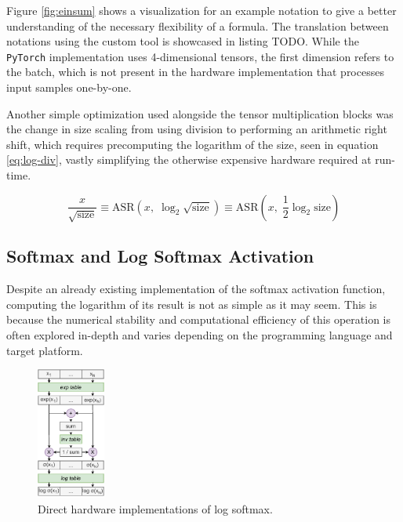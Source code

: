 Figure \ref{fig:einsum} shows a visualization for an example notation to give a better understanding of the necessary flexibility of a formula. The translation between notations using the custom tool is showcased in listing TODO. While the \texttt{PyTorch} implementation uses 4-dimensional tensors, the first dimension refers to the batch, which is not present in the hardware implementation that processes input samples one-by-one.

\todofig{|}
\todofig{|}
\todofig{|}
\todofig{|}
\todofig{|}

Another simple optimization used alongside the tensor multiplication blocks was the change in size scaling from using division to performing an arithmetic right shift, which requires precomputing the logarithm of the size, seen in equation \ref{eq:log-div}, vastly simplifying the otherwise expensive hardware required at run-time.

\begin{equation}\label{eq:log-div}
  \frac{x}{\sqrt{\text{size}}} \equiv \text{ASR}(x,\; \log_2 \sqrt{\text{size}}) \equiv \text{ASR}(x,\; \frac{1}{2}\log_2 \text{size})
\end{equation}


\subsection{Softmax and Log Softmax Activation}
Despite an already existing \hlsml implementation of the softmax activation function, computing the logarithm of its result is not as simple as it may seem. This is because the numerical stability and computational efficiency of this operation is often explored in-depth \cite{60-blanchard2019accurate} and varies depending on the programming language and target platform.

\begin{figure}[hpt!]
  \centering
  \includegraphics[trim={0cm 0cm 0cm 0cm}, width=0.2\textwidth, center]{models/log_softmax_naive.pdf}
  \caption{Direct hardware implementations of log softmax.}
  \label{fig:log-softmax-naive}
\end{figure}

